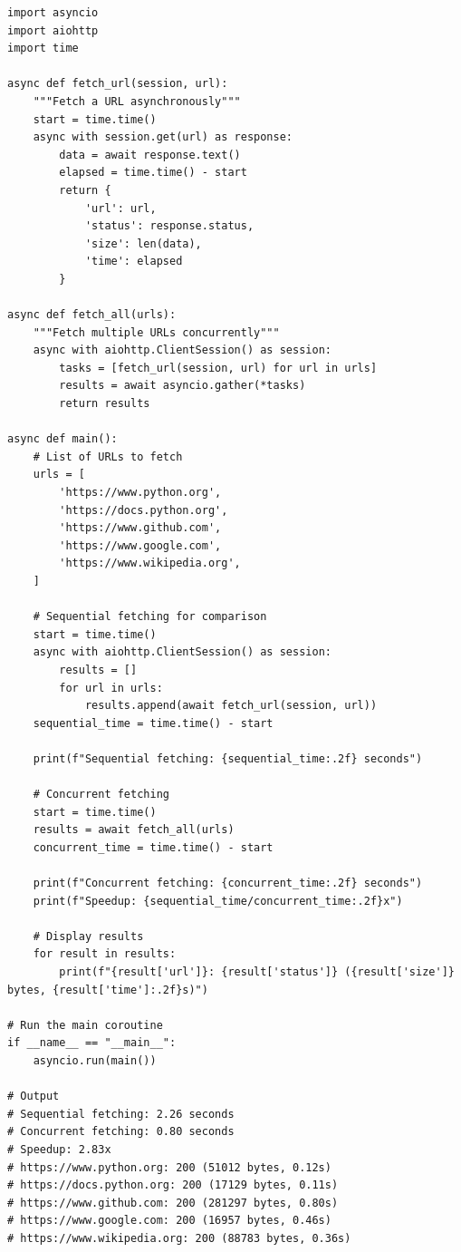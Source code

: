 \documentclass[12pt,letterpaper]{article}
\newenvironment{macterminal}{%
    \begin{mdframed}[
        linecolor=terminalFrame,
        backgroundcolor=terminalBg,
        roundcorner=5pt,
        skipabove=10pt,
        skipbelow=10pt,
        linewidth=1pt,
        innertopmargin=10pt, %
        frametitle={%
            \tikz[baseline=(current bounding box.east), outer sep=0pt]{
                \fill[red!80!black] (0,0) circle (5pt);
                \fill[yellow!80!black] (0.7,0) circle (5pt);
                \fill[green!70!black] (1.4,0) circle (5pt);
            }
        },
        frametitlealignment=\raggedright, %
        frametitleaboveskip=8pt, %
        frametitlebelowskip=0pt, %
    ]
}{%
    \end{mdframed}%
}
\begin{document}
\begin{macterminal}
\begin{lstlisting}
import asyncio
import aiohttp
import time

async def fetch_url(session, url):
    """Fetch a URL asynchronously"""
    start = time.time()
    async with session.get(url) as response:
        data = await response.text()
        elapsed = time.time() - start
        return {
            'url': url,
            'status': response.status,
            'size': len(data),
            'time': elapsed
        }

async def fetch_all(urls):
    """Fetch multiple URLs concurrently"""
    async with aiohttp.ClientSession() as session:
        tasks = [fetch_url(session, url) for url in urls]
        results = await asyncio.gather(*tasks)
        return results

async def main():
    # List of URLs to fetch
    urls = [
        'https://www.python.org',
        'https://docs.python.org',
        'https://www.github.com',
        'https://www.google.com',
        'https://www.wikipedia.org',
    ]
    
    # Sequential fetching for comparison
    start = time.time()
    async with aiohttp.ClientSession() as session:
        results = []
        for url in urls:
            results.append(await fetch_url(session, url))
    sequential_time = time.time() - start
    
    print(f"Sequential fetching: {sequential_time:.2f} seconds")
    
    # Concurrent fetching
    start = time.time()
    results = await fetch_all(urls)
    concurrent_time = time.time() - start
    
    print(f"Concurrent fetching: {concurrent_time:.2f} seconds")
    print(f"Speedup: {sequential_time/concurrent_time:.2f}x")
    
    # Display results
    for result in results:
        print(f"{result['url']}: {result['status']} ({result['size']} bytes, {result['time']:.2f}s)")

# Run the main coroutine
if __name__ == "__main__":
    asyncio.run(main())

# Output
# Sequential fetching: 2.26 seconds
# Concurrent fetching: 0.80 seconds
# Speedup: 2.83x
# https://www.python.org: 200 (51012 bytes, 0.12s)
# https://docs.python.org: 200 (17129 bytes, 0.11s)
# https://www.github.com: 200 (281297 bytes, 0.80s)
# https://www.google.com: 200 (16957 bytes, 0.46s)
# https://www.wikipedia.org: 200 (88783 bytes, 0.36s)
\end{lstlisting}
\end{macterminal}
\end{document}
